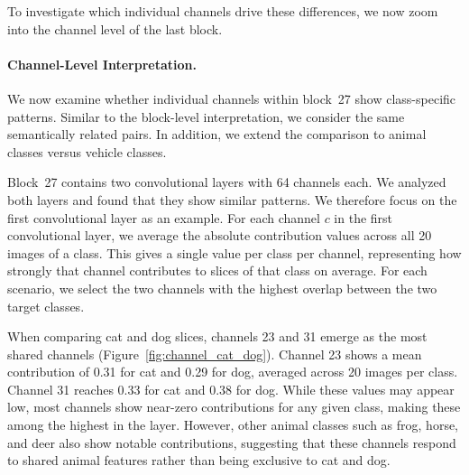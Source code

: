 \documentclass[
12pt,
fancyheadings,
a4paper,
twoside,
BCOR=0.7cm,
nobcorignoretitle,
grayscalebody,
]{stsreprt}
\begin{document}
To investigate which individual channels drive these differences, we now zoom into the channel
level of the last block.


\paragraph{Channel-Level Interpretation.}
We now examine whether individual channels within block~27 show class-specific patterns.
Similar to the block-level interpretation, we consider the same semantically related pairs.
In addition, we extend the comparison to animal classes versus vehicle classes.

Block~27 contains two convolutional layers with 64 channels each. We analyzed both layers and found
that they show similar patterns. We therefore focus on the first convolutional layer as an example.
For each channel $c$ in the first convolutional layer, we average the absolute contribution values
across all 20 images of a class. This gives a single value per class per channel, representing how
strongly that channel contributes to slices of that class on average.
For each scenario, we select the two channels with the highest overlap between the two target
classes.

When comparing cat and dog slices, channels 23 and 31 emerge as the most shared channels
(Figure~\ref{fig:channel_cat_dog}).
Channel 23 shows a mean contribution of 0.31 for cat and 0.29 for dog, averaged across 20 images
per class. Channel 31 reaches 0.33 for cat and 0.38 for dog. While these values may appear low,
most channels show near-zero contributions for any given class, making these among the highest in
the layer.
However, other animal classes such as frog, horse, and deer also show notable contributions,
suggesting that these channels respond to shared animal features rather than being exclusive to cat
and dog.
\end{document}
